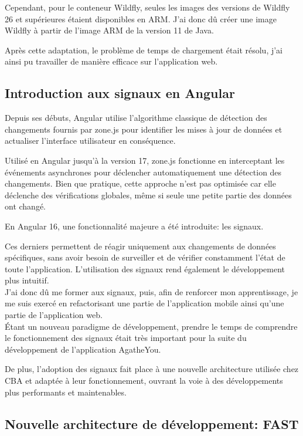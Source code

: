 \documentclass{article}
\begin{document}
Cependant, pour le conteneur Wildfly, seules les images des versions de Wildfly 26 et supérieures étaient disponibles en ARM. J'ai donc dû créer une image Wildfly à partir de l'image ARM de la version 11 de Java.

Après cette adaptation, le problème de temps de chargement était résolu, j'ai ainsi pu travailler de manière efficace sur l'application web.

\subsection{Introduction aux signaux en Angular}

Depuis ses débuts, Angular utilise l'algorithme classique de détection des changements fournis par zone.js pour identifier les mises à jour de données et actualiser l'interface utilisateur en conséquence.

Utilisé en Angular jusqu'à la version 17, zone.js fonctionne en interceptant les événements asynchrones pour déclencher automatiquement une détection des changements. Bien que pratique, cette approche n'est pas optimisée car elle déclenche des vérifications globales, même si seule une petite partie des données ont changé.

En Angular 16, une fonctionnalité majeure a été introduite: les signaux.

Ces derniers permettent de réagir uniquement aux changements de données spécifiques, sans avoir besoin de surveiller et de vérifier constamment l'état de toute l'application. L'utilisation des signaux rend également le développement plus intuitif. \\

J'ai donc dû me former aux signaux, puis, afin de renforcer mon apprentissage, je me suis exercé en refactorisant une partie de l'application mobile ainsi qu'une partie de l'application web. \\

Étant un nouveau paradigme de développement, prendre le temps de comprendre le fonctionnement des signaux était très important pour la suite du développement de l'application AgatheYou.

De plus, l'adoption des signaux fait place à une nouvelle architecture utilisée chez CBA et adaptée à leur fonctionnement, ouvrant la voie à des développements plus performants et maintenables.

\subsection{Nouvelle architecture de développement: FAST}
\end{document}
